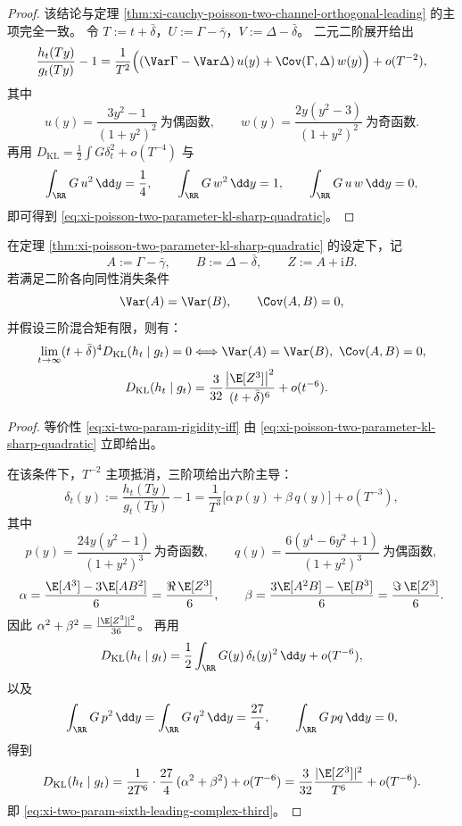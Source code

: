 \begin{proof}
该结论与定理 \ref{thm:xi-cauchy-poisson-two-channel-orthogonal-leading} 的主项完全一致。
令 \(T:=t+\bar\delta\)，\(U:=\Gamma-\bar\gamma\)，\(V:=\Delta-\bar\delta\)。
二元二阶展开给出
\[
\frac{h_t(Ty)}{g_t(Ty)}-1
=\frac{1}{T^2}\Bigl((\Var\Gamma-\Var\Delta)\,u(y)+\Cov(\Gamma,\Delta)\,w(y)\Bigr)+o(T^{-2}),
\]
其中
\[
u(y)=\frac{3y^2-1}{(1+y^2)^2}\ \text{为偶函数},\qquad
w(y)=\frac{2y(y^2-3)}{(1+y^2)^2}\ \text{为奇函数}.
\]
再用
\(
D_{\mathrm{KL}}=\frac12\int G\delta_t^2+o(T^{-4})
\)
与
\[
\int_{\RR}G\,u^2\,\dd y=\frac14,\qquad
\int_{\RR}G\,w^2\,\dd y=1,\qquad
\int_{\RR}G\,u\,w\,\dd y=0,
\]
即可得到 \eqref{eq:xi-poisson-two-parameter-kl-sharp-quadratic}。
\end{proof}

\begin{theorem}[双参数超四次衰减的刚性与六阶主项]\label{thm:xi-poisson-two-parameter-sixth-rigidity-complex-third}
在定理 \ref{thm:xi-poisson-two-parameter-kl-sharp-quadratic} 的设定下，记
\[
A:=\Gamma-\bar\gamma,\qquad
B:=\Delta-\bar\delta,\qquad
Z:=A+\mathrm{i}B.
\]
若满足二阶各向同性消失条件
\[
\Var(A)=\Var(B),\qquad \Cov(A,B)=0,
\]
并假设三阶混合矩有限，则有：
\begin{align}
\lim_{t\to\infty}(t+\bar\delta)^4D_{\mathrm{KL}}(h_t\mid g_t)=0
&\Longleftrightarrow
\Var(A)=\Var(B),\ \Cov(A,B)=0,\label{eq:xi-two-param-rigidity-iff}\\
D_{\mathrm{KL}}(h_t\mid g_t)
&=\frac{3}{32}\frac{\left|\E[Z^3]\right|^2}{(t+\bar\delta)^6}
+o(t^{-6}).\label{eq:xi-two-param-sixth-leading-complex-third}
\end{align}
\end{theorem}

\begin{proof}
等价性 \eqref{eq:xi-two-param-rigidity-iff} 由
\eqref{eq:xi-poisson-two-parameter-kl-sharp-quadratic}
立即给出。

在该条件下，\(T^{-2}\) 主项抵消，三阶项给出六阶主导：
\[
\delta_t(y):=\frac{h_t(Ty)}{g_t(Ty)}-1
=\frac{1}{T^3}\bigl[\alpha\,p(y)+\beta\,q(y)\bigr]+o(T^{-3}),
\]
其中
\[
p(y)=\frac{24y(y^2-1)}{(1+y^2)^3}\ \text{为奇函数},\qquad
q(y)=\frac{6(y^4-6y^2+1)}{(1+y^2)^3}\ \text{为偶函数},
\]
\[
\alpha=\frac{\E[A^3]-3\E[AB^2]}{6}=\frac{\Re\,\E[Z^3]}{6},\qquad
\beta=\frac{3\E[A^2B]-\E[B^3]}{6}=\frac{\Im\,\E[Z^3]}{6}.
\]
因此 \(\alpha^2+\beta^2=\frac{|\E[Z^3]|^2}{36}\)。
再用
\[
D_{\mathrm{KL}}(h_t\mid g_t)
=\frac12\int_{\RR}G(y)\,\delta_t(y)^2\,\dd y+o(T^{-6}),
\]
以及
\[
\int_{\RR}G\,p^2\,\dd y=\int_{\RR}G\,q^2\,\dd y=\frac{27}{4},\qquad
\int_{\RR}G\,pq\,\dd y=0,
\]
得到
\[
D_{\mathrm{KL}}(h_t\mid g_t)
=\frac{1}{2T^6}\cdot\frac{27}{4}\,(\alpha^2+\beta^2)+o(T^{-6})
=\frac{3}{32}\frac{|\E[Z^3]|^2}{T^6}+o(T^{-6}).
\]
即 \eqref{eq:xi-two-param-sixth-leading-complex-third}。
\end{proof}

